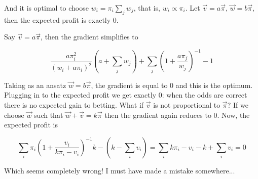 \documentclass[11pt]{article}
\begin{document}
And it is optimal to choose $w_i = \pi_i \sum_j w_j$, that is, $w_i \propto \pi_i$.  Let $\vec{v} = a\vec{\pi}$, $\vec{w} = b\vec{\pi}$, then the expected profit is exactly 0.

Say $\vec{v} = a\vec{\pi}$, then the gradient simplifies to 

\[ \frac{a\pi_i^2}{(w_i + a\pi_i)^2} \left(a + \sum_j w_j\right) + \sum_j \left(1+ \frac{a\pi_j}{w_j}\right)^{-1} - 1 \]

Taking as an ansatz $\vec{w} = b\vec{\pi}$, the gradient is equal to 0 and this is the optimum.  Plugging in to the expected profit we get exactly 0: when the odds are correct there is no expected gain to betting.  What if $\vec{v}$ is not proportional to $\vec{\pi}$?  If we choose $\vec{w}$ such that $\vec{w} + \vec{v} = k\vec{\pi}$ then the gradient again reduces to 0.  Now, the expected profit is

\[ \sum_i \pi_i \left(1 + \frac{v_i}{k\pi_i - v_i}\right)^{-1}k - \left(k - \sum_i v_i\right) = \sum_i  k\pi_i - v_i - k + \sum_i v_i = 0\]

Which seems completely wrong!  I must have made a mistake somewhere...
\end{document}
